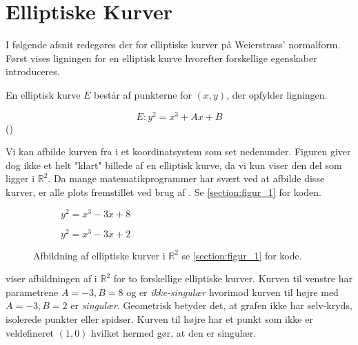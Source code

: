 \section{Elliptiske Kurver}\label{sec:elliptiske_kurver}
I følgende afsnit redegøres der for elliptiske kurver på Weierstrass' normalform. Først vises ligningen for en elliptisk kurve hvorefter forskellige egenskaber introduceres. 

\begin{mdframed}[frametitle={Weierstrass' normalform for elliptisk kurve}]
En elliptisk kurve $E$ består af punkterne for $(x,y)$, der opfylder ligningen.

\begin{equation}\label{eq:E}
    E:  y^2=x^3+Ax+B
\end{equation}
(\cite{youssefelhousni2018})
\end{mdframed}

Vi kan afbilde kurven fra  i et koordinatsystem som set nedenunder. Figuren giver dog ikke et helt "klart" billede af en elliptisk kurve, da vi kun viser den del som ligger i $\mathbb{R}^2$. Da mange matematikprogrammer har svært ved at afbilde disse kurver, er alle plots fremstillet ved brug af . Se \ref{section:figur_1} for koden.
\begin{figure}[htbp]
\centering
\begin{subfigure}{.5\textwidth}
  \centering
  
  \caption{$y^2=x^3-3x+8$}
  \label{fig:sub1}
\end{subfigure}%
\begin{subfigure}{.5\textwidth}
  \centering
  
  \caption{$y^2=x^3-3x+2$}
  \label{fig:sub2}
\end{subfigure}
\caption{Afbildning af elliptiske kurver i $\mathbb{R}^2$ se \ref{section:figur_1} for kode.}
\label{fig:elliptiske_kurver_i_R}
\end{figure}
\FloatBarrier

 viser afbildningen af  i $\mathbb{R}^2$ for to forskellige elliptiske kurver. Kurven til venstre har parametrene $A= -3, B= 8$ og er \textit{ikke-singulær} hvorimod kurven til højre med $A= -3, B =2$ er \textit{singulær}. Geometrisk betyder det, at grafen ikke har selv-kryds, isolerede punkter eller spidser. Kurven til højre har et punkt som ikke er veldefineret $(1,0)$ hvilket hermed gør, at den er singulær.

